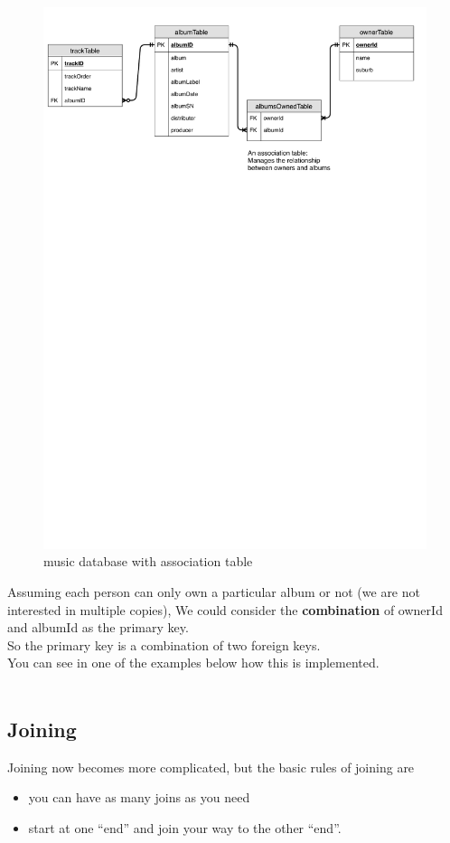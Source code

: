 \documentclass[a4paper,12pt]{article}
\begin{document}
\begin{figure}[!h]
	\centering
	\includegraphics[width=18cm]{DataBaseDiagrams-AssociationMusic.pdf}
	\caption*{music database with association table}
\end{figure}

Assuming each person can only own a particular album or not (we are not interested in multiple copies), We could consider the \textbf{combination} of ownerId and albumId as the primary key.\\
So the primary key is a combination of two foreign keys.\\
You can see in one of the examples below how this is implemented.\\\\
 \subsection{Joining}
Joining now becomes more complicated, but the basic rules of joining are
\begin{itemize}
	\item you can have as many joins as you need
	\item start at one ``end'' and join your way to the other ``end''.
\end{itemize}
\end{document}
